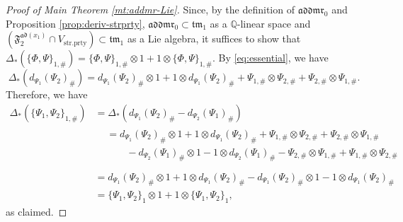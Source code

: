 \documentclass[15pt,oneside,reqno]{amsart}
\newtheorem{cor}[df]{Corollary}
\theoremstyle{remark}{
\newtheorem{lem}[df]{Lemma}
\newtheorem{prop}[df]{Proposition}
\newtheorem{ex}[df]{Example}
\newtheorem{rmk}[df]{Remark}
}
\newcommand{\Q}{\mathbb{Q}}
\newcommand{\addmr}{\mathfrak{addmr}}
\newcommand{\ad}{\mathfrak{ad}}
\newcommand{\tm}{\mathfrak{tm}}
\newcommand{\Fad}{\mathfrak{F}_2^{\ad(x_1)}}
\newcommand{\strprty}{\mathrm{str.prty}}
\begin{document}

\begin{proof}[Proof of Main Theorem \ref{mt:addmr-Lie}]

Since, by the definition of $\addmr_0$ and Proposition \ref{prop:deriv-strprty}, $\addmr_0 \subset \tm_1$ as a $\Q$-linear space and $ (\Fad \cap  V_{\strprty}) \subset \tm_1$ as a Lie algebra, it suffices to show that $\Delta_*(\{\Phi,\Psi\}_{1,\#}) = \{\Phi,\Psi\}_{1,\#} \otimes 1 + 1\otimes \{\Phi,\Psi\}_{1,\#}$.
By \eqref{eq:essential}, we have
\[
\Delta_*(d_{\Psi_1}(\Psi_2)_{\#})  =d_{\Psi_1}(\Psi_2)_{\#} \otimes 1 + 1\otimes d_{\Psi_1}(\Psi_2)_{\#} +  \Psi_{1,\#} \otimes \Psi_{2,\#} + \Psi_{2,\#} \otimes \Psi_{1,\#}.
\]
Therefore, we have
\begin{align*}
\Delta_*(\{\Psi_1,\Psi_2\}_{1,\#}) &= \Delta_*(d_{\Psi_1}(\Psi_2)_{\#} - d_{\Psi_2}(\Psi_1)_{\#} ) \\
&\begin{aligned}
&=d_{\Psi_1}(\Psi_2)_{\#} \otimes 1 + 1\otimes d_{\Psi_1}(\Psi_2)_{\#} +  \Psi_{1,\#} \otimes \Psi_{2,\#} + \Psi_{2,\#} \otimes \Psi_{1,\#}\\
&\qquad-d_{\Psi_2}(\Psi_1)_{\#} \otimes 1 - 1\otimes d_{\Psi_2}(\Psi_1)_{\#}  -  \Psi_{2,\#} \otimes \Psi_{1,\#} + \Psi_{1,\#} \otimes \Psi_{2,\#}\\
\end{aligned}\\
&= d_{\Psi_1}(\Psi_2)_{\#} \otimes 1 + 1\otimes d_{\Psi_1}(\Psi_2)_{\#} - d_{\Psi_1}(\Psi_2)_{\#} \otimes 1 - 1\otimes d_{\Psi_1}(\Psi_2)_{\#}\\
&=\{\Psi_1,\Psi_2\}_1 \otimes1 + 1\otimes \{\Psi_1,\Psi_2\}_1,
\end{align*}
as claimed.
\end{proof}
\end{document}

